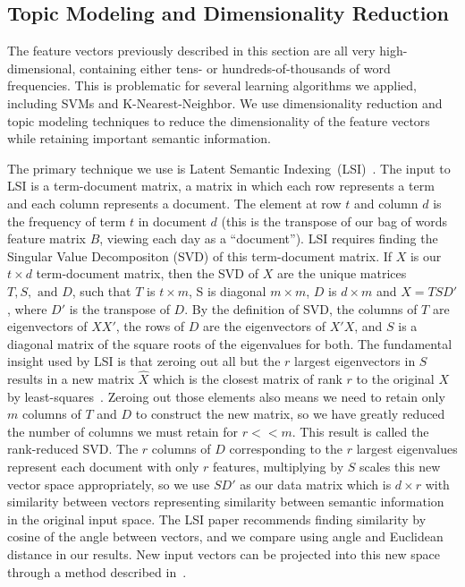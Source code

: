 \documentclass[10pt, twocolumn]{article}
\begin{document}
\subsection{Topic Modeling and Dimensionality Reduction}
\label{sec:topicmodel}

The feature vectors previously described in this section are all very high-dimensional, containing either tens- or hundreds-of-thousands of word frequencies. This is problematic for several learning algorithms we applied, including SVMs and K-Nearest-Neighbor. We use dimensionality reduction and topic modeling techniques to reduce the dimensionality of the feature vectors while retaining important semantic information.

The primary technique we use is Latent Semantic Indexing~(LSI)~\cite{lsi}. The input to LSI is a term-document matrix, a matrix in which each row represents a term and each column represents a document. The element at row $t$ and column $d$ is the frequency of term $t$ in document $d$ (this is the transpose of our bag of words feature matrix $B$, viewing each day as a ``document''). LSI requires finding the Singular Value Decompositon (SVD) of this term-document matrix. If $X$ is our $t \times d$ term-document matrix, then the SVD of $X$ are the unique matrices $T, S, \text{ and } D$, such that $T$ is $t \times m$, S is diagonal $m \times m$, $D$ is $d \times m$ and $X = T S D'$, where $D'$ is the transpose of $D$. By the definition of SVD, the columns of $T$ are eigenvectors of $X X'$, the rows of $D$ are the eigenvectors of $X' X$, and $S$ is a diagonal matrix of the square roots of the eigenvalues for both. The fundamental insight used by LSI is that zeroing out all but the $r$ largest eigenvectors in $S$ results in a new matrix $\hat{X}$ which is the closest matrix of rank $r$ to the original $X$ by least-squares~\cite{lsi}. Zeroing out those elements also means we need to retain only $m$ columns of $T$ and $D$ to construct the new matrix, so we have greatly reduced the number of columns we must retain for $r << m$. This result is called the rank-reduced SVD. The $r$ columns of $D$ corresponding to the $r$ largest eigenvalues represent each document with only $r$ features, multiplying by $S$ scales this new vector space appropriately, so we use $S D'$ as our data matrix which is $d \times r$ with similarity between vectors representing similarity between semantic information in the original input space. The LSI paper recommends finding similarity by cosine of the angle between vectors, and we compare using angle and Euclidean distance in our results. New input vectors can be projected into this new space through a method described in~\cite{lsi}.
\end{document}
